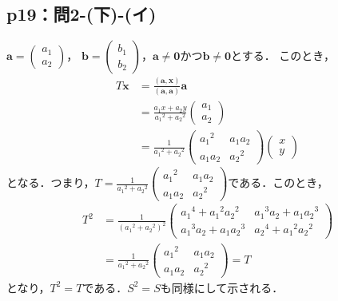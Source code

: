 \subsection*{p19：問2-(下)-(イ)}
\begin{tproof}
  $\bm{a}=
    \begin{pmatrix}
      a_1 \\
      a_2
    \end{pmatrix}
  $，
  $\bm{b}=
    \begin{pmatrix}
      b_1 \\
      b_2
    \end{pmatrix}
  $，$\bm{a} \ne \bm{0}$かつ$\bm{b} \ne \bm{0}$とする．
  このとき，
  \begin{align*}
    T \bm{x} & =\frac{(\bm{a},\bm{x})}{(\bm{a},\bm{a})} \bm{a} \\
             & = \frac{a_1 x + a_2 y}{{a_1}^2+{a_2}^2}
    \begin{pmatrix}
      a_1 \\
      a_2
    \end{pmatrix}
    \\
             & =
    \frac{1}{{a_1}^2+{a_2}^2}
    \begin{pmatrix}
      {a_1}^2 & a_1 a_2 \\
      a_1 a_2 & {a_2}^2
    \end{pmatrix}
    \begin{pmatrix}
      x \\
      y
    \end{pmatrix}
  \end{align*}
  となる．つまり，$T=\frac{1}{{a_1}^2+{a_2}^2}
    \begin{pmatrix}
      {a_1}^2 & a_1 a_2 \\
      a_1 a_2 & {a_2}^2
    \end{pmatrix}
  $である．このとき，
  \begin{align*}
    T^2 & = \frac{1}{({a_1}^2+{a_2}^2)^2}
    \begin{pmatrix}
      {a_1}^4 + {a_1}^2 {a_2}^2 & {a_1}^3 a_2 + a_1 {a_2}^3 \\
      {a_1}^3 a_2 + a_1 {a_2}^3 & {a_2}^4 + {a_1}^2 {a_2}^2
    \end{pmatrix}
    \\
        & = \frac{1}{{a_1}^2+{a_2}^2}
    \begin{pmatrix}
      {a_1}^2 & a_1 a_2 \\
      a_1 a_2 & {a_2}^2
    \end{pmatrix}
    =T
  \end{align*}
  となり，$T^2=T$である．$S^2=S$も同様にして示される．
\end{tproof}

